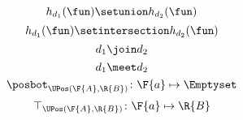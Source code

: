 {\begin{forslides}
    \begin{equation}
        \label{eq:upos_lat_1}
        h_{d_1}(\fun)\setunion h_{d_2}(\fun)
    \end{equation}
    \begin{equation}
        \label{eq:upos_lat_2}
        h_{d_1}(\fun)\setintersection h_{d_2}(\fun)
    \end{equation}
    \begin{equation}
        \label{eq:upos_lat_3}
        d_1\join d_2
    \end{equation}
    \begin{equation}
        \label{eq:upos_lat_4}
        d_1\meet d_2
    \end{equation}
    \begin{equation}
        \label{eq:upos_lat_5}
        \posbot_{\UPos(\F{A},\R{B})}\colon \F{a}\mapsto \Emptyset
    \end{equation}
    \begin{equation}
        \label{eq:upos_lat_6}
        \top_{\UPos(\F{A},\R{B})}\colon \F{a}\mapsto \R{B}
    \end{equation}
\end{forslides}
}

